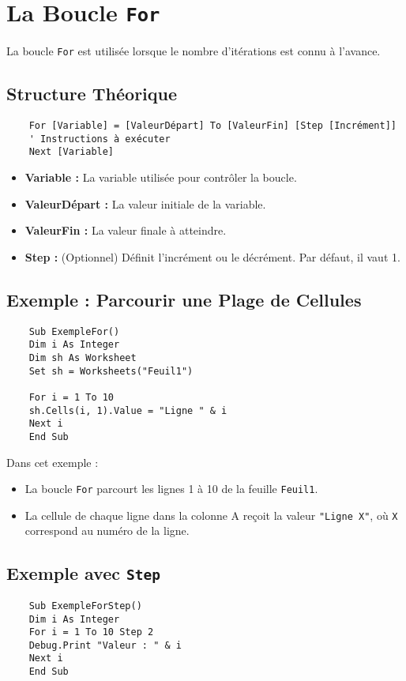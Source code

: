 \documentclass[a4paper,12pt]{report}
\begin{document}
\section{La Boucle \texttt{For}}
La boucle \texttt{For} est utilisée lorsque le nombre d'itérations est connu à l'avance.

\subsection*{Structure Théorique}
\begin{lstlisting}
	For [Variable] = [ValeurDépart] To [ValeurFin] [Step [Incrément]]
	' Instructions à exécuter
	Next [Variable]
\end{lstlisting}

\begin{itemize}
	\item \textbf{Variable :} La variable utilisée pour contrôler la boucle.
	\item \textbf{ValeurDépart :} La valeur initiale de la variable.
	\item \textbf{ValeurFin :} La valeur finale à atteindre.
	\item \textbf{Step :} (Optionnel) Définit l'incrément ou le décrément. Par défaut, il vaut 1.
\end{itemize}

\subsection*{Exemple : Parcourir une Plage de Cellules}
\begin{lstlisting}
	Sub ExempleFor()
	Dim i As Integer
	Dim sh As Worksheet
	Set sh = Worksheets("Feuil1")
	
	For i = 1 To 10
	sh.Cells(i, 1).Value = "Ligne " & i
	Next i
	End Sub
\end{lstlisting}

Dans cet exemple :
\begin{itemize}
	\item La boucle \texttt{For} parcourt les lignes 1 à 10 de la feuille \texttt{Feuil1}.
	\item La cellule de chaque ligne dans la colonne A reçoit la valeur \texttt{"Ligne X"}, où \texttt{X} correspond au numéro de la ligne.
\end{itemize}

\subsection*{Exemple avec \texttt{Step}}
\begin{lstlisting}
	Sub ExempleForStep()
	Dim i As Integer
	For i = 1 To 10 Step 2
	Debug.Print "Valeur : " & i
	Next i
	End Sub
\end{lstlisting}
\end{document}
